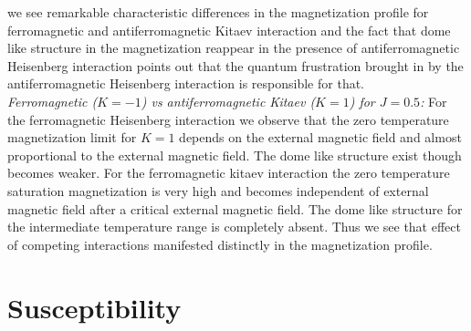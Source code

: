 \documentclass[aps,amsmath,twocolumn,amssymb,floatfix,showpacs,superscriptaddress,nofootinbib,longbibliography]{revtex4-1}
\begin{document}
we see remarkable characteristic differences in the magnetization profile for ferromagnetic and antiferromagnetic Kitaev interaction and the fact that dome like structure in the magnetization reappear in the presence of antiferromagnetic Heisenberg interaction points out that the quantum frustration brought in by the antiferromagnetic Heisenberg interaction is responsible for that.\\
\indent
{\it \small{Ferromagnetic ($K=-1$) vs antiferromagnetic Kitaev ($K=1$) for $J=0.5$:}} For the ferromagnetic
Heisenberg interaction we observe that the zero temperature magnetization limit for $K=1$ depends on the external magnetic field and almost proportional to the external magnetic field. The dome like structure exist though becomes weaker. For the ferromagnetic kitaev interaction the zero temperature saturation magnetization is very high and becomes independent of external magnetic field after a critical external magnetic field. The dome like
structure for the intermediate temperature range is completely absent. Thus we see that effect of competing interactions manifested distinctly in the magnetization profile.





\section{Susceptibility}
\label{susceptibility}
\end{document}
